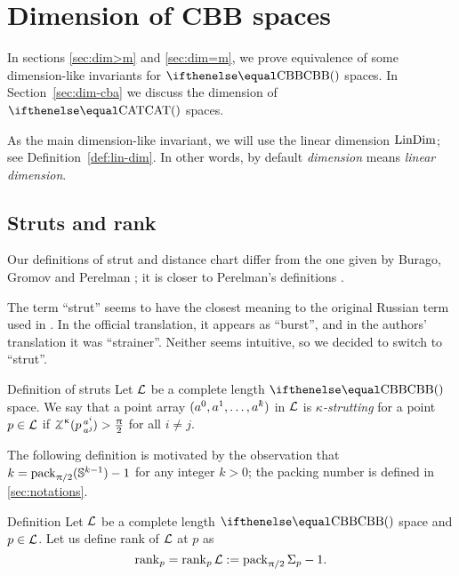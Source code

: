 \chapter{Dimension of CBB spaces}

In sections \ref{sec:dim>m} and \ref{sec:dim=m},
we prove equivalence of some dimension-like invariants for $\Alex{}$ spaces.
In Section~\ref{sec:dim-cba} we discuss the dimension of  $\CAT{}$ spaces.

As the main dimension-like invariant, we will use  the linear dimension $\mathop{\rm LinDim}\nolimits$; 
see Definition~\ref{def:lin-dim}. In other words,  by default {}\emph{dimension} means {}\emph{linear dimension}. 


\section{Struts and rank}\label{sec:struts+rank}

Our definitions of strut 
and distance chart 
differ from the one 
given by 
Burago, 
Gromov 
and Perelman \cite{burago-gromov-perelman};
it is closer to Perelman's definitions \cite{perelman:spaces2,perelman:morse}.

The term ``strut'' seems to have the closest meaning to the original Russian term used in \cite{burago-gromov-perelman}.
In the official translation,
it appears as ``burst'', 
and in the authors' translation it was ``strainer''.
Neither seems intuitive, 
so we decided to switch to ``strut''.




\begin{thm}{Definition of struts}\label{def:strut-I}
Let $\mathcal{L}$ be a complete length $\Alex{}$ space.
We say that a point array $(a^0,a^1,\dots,a^\kay)$ in $\mathcal{L}$
 is \emph{$\kappa$-strutting} for a point $p\in\spc{L}$ if $\angk\kappa p {a^i}{a^j}>\tfrac\pi2$ for all $i\not=j$.
\end{thm} 

The following definition is motivated by the observation that $k\z=\pack_{\pi/2}(\SS^{k-1})-1$ for any integer $k>0$; the packing number is defined in \ref{sec:notations}.


\begin{thm}{Definition}\label{def:rank}
Let $\mathcal{L}$ be a complete length $\Alex{}$ space
and $p\in \spc{L}$.
Let us define rank of $\mathcal{L}$ at $p$ as 
\[\mathop{\rm rank}\nolimits_p=\mathop{\rm rank}\nolimits_p\mathcal{L}
:=
\mathop{\rm pack}\nolimits_{\uppi/2}\Sigma_p-1.\]

\end{thm}




